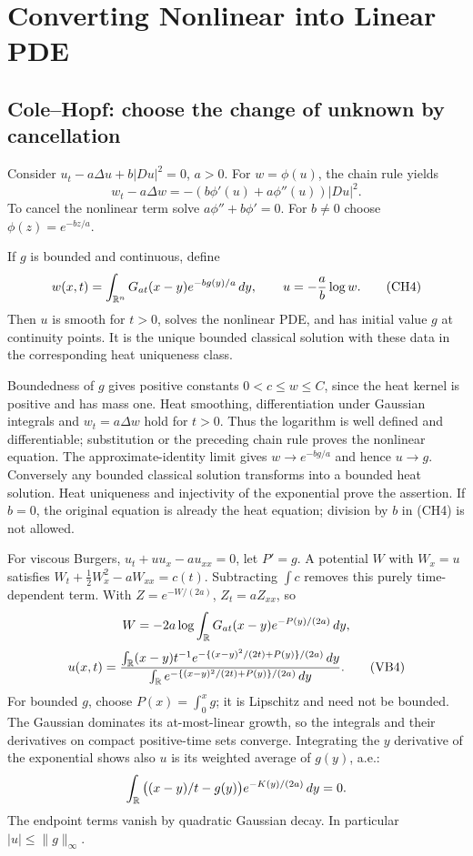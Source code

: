 \Needspace{65mm}
\section{Converting Nonlinear into Linear PDE}\label{sec:4-4}
\Needspace{35mm}
\subsection{Cole--Hopf: choose the change of unknown by cancellation}
Consider $u_t-a\Delta u+b|Du|^2=0$, $a>0$.
For $w=\phi(u)$, the chain rule yields
\[
 w_t-a\Delta w=-(b\phi'(u)+a\phi''(u))|Du|^2 .
\]
To cancel the nonlinear term solve $a\phi''+b\phi'=0$.
For $b\ne0$ choose $\phi(z)=e^{-bz/a}$.
\begin{theorem}
If $g$ is bounded and continuous, define
\[
 w(x,t)=\int_{\mathbb{R}^n}G_{at}(x-y)e^{-bg(y)/a}\,dy,\qquad
 u=-\frac ab\log w .
 \tag{CH4}
\]
Then $u$ is smooth for $t>0$, solves the nonlinear PDE, and
has initial value $g$ at continuity points. It is the unique bounded
classical solution with these data in the corresponding heat uniqueness class.
\end{theorem}
\begin{expandedproof}
Boundedness of $g$ gives positive constants $0<c\leq w\leq C$,
since the heat kernel is positive and has mass one.
Heat smoothing, differentiation under Gaussian integrals and
$w_t=a\Delta w$ hold for $t>0$.
Thus the logarithm is well defined and differentiable; substitution
or the preceding chain rule proves the nonlinear equation.
The approximate-identity limit gives $w\to e^{-bg/a}$ and hence $u\to g$.
Conversely any bounded classical solution transforms into a bounded
heat solution. Heat uniqueness and injectivity of the exponential prove
the assertion. If $b=0$, the original equation is already the heat
equation; division by $b$ in (CH4) is not allowed.
\end{expandedproof}
\Needspace{45mm}

For viscous Burgers, $u_t+uu_x-au_{xx}=0$, let $P'=g$.
A potential $W$ with $W_x=u$ satisfies
$W_t+\tfrac12W_x^2-aW_{xx}=c(t)$.
Subtracting $\int c$ removes this purely time-dependent term.
With $Z=e^{-W/(2a)}$, $Z_t=aZ_{xx}$, so
\[
 W=-2a\log\int_{\mathbb{R}} G_{at}(x-y)e^{-P(y)/(2a)}\,dy ,
\]
\[
 u(x,t)=
 \frac{\int_{\mathbb{R}} (x-y)t^{-1}e^{-\{(x-y)^2/(2t)+P(y)\}/(2a)}\,dy}
      {\int_{\mathbb{R}} e^{-\{(x-y)^2/(2t)+P(y)\}/(2a)}\,dy}.
 \tag{VB4}
\]
For bounded $g$, choose $P(x)=\int_0^xg$; it is Lipschitz and need
not be bounded. The Gaussian dominates its at-most-linear growth,
so the integrals and their derivatives on compact positive-time sets
converge.
Integrating the $y$ derivative of the exponential shows also
$u$ is its weighted average of $g(y)$, a.e.:
\[
 \int_{\mathbb{R}}\big((x-y)/t-g(y)\big)e^{-K(y)/(2a)}\,dy=0 .
\]
The endpoint terms vanish by quadratic Gaussian decay.
In particular $|u|\leq\|g\|_\infty$.
\Needspace{45mm}

